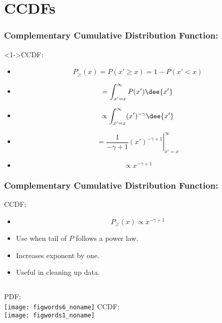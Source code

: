 \section{CCDFs}

\begin{frame}
  \frametitle{\small Complementary Cumulative Distribution Function:}

  \begin{block}<1->{CCDF:}
    \begin{itemize}
    \item<2->
      $$ P_{\ge}(x) = P(x' \ge x)  = 1 - P(x'<x) $$
    \item<3->
      $$ = \int_{x' = x}^{\infty} P(x') \dee{x'}  $$
    \item<4->
      $$ \propto \int_{x' = x}^{\infty} (x')^{-\gamma} \dee{x'}  $$
    \item<5->
      $$ = \left. \frac{1}{-\gamma+1}(x')^{-\gamma+1} \right|_{x' = x}^{\infty} $$
    \item<6->
      $$ \propto x^{-\gamma+1} $$
    \end{itemize}
  \end{block}

\end{frame}

\begin{frame}
  \frametitle{\small Complementary Cumulative Distribution Function:}

  \begin{block}{CCDF:}
    \begin{itemize}
    \item<1->
      $$ P_{\ge}(x) \propto x^{-\gamma+1} $$
    \item<2->
      Use when tail of $P$ follows a power law.
    \item<3->
      Increases exponent by one.
    \item<4->
      Useful in cleaning up data.
    \end{itemize}
  \end{block}

  \begin{overprint}
    \begin{block}{}
      \begin{columns}
        PDF:\\
        \texttt{[image: figwords6\_noname]}
        CCDF:\\
        \texttt{[image: figwords1\_noname]}
      \end{columns}
    \end{block}
  \end{overprint}

\end{frame}

